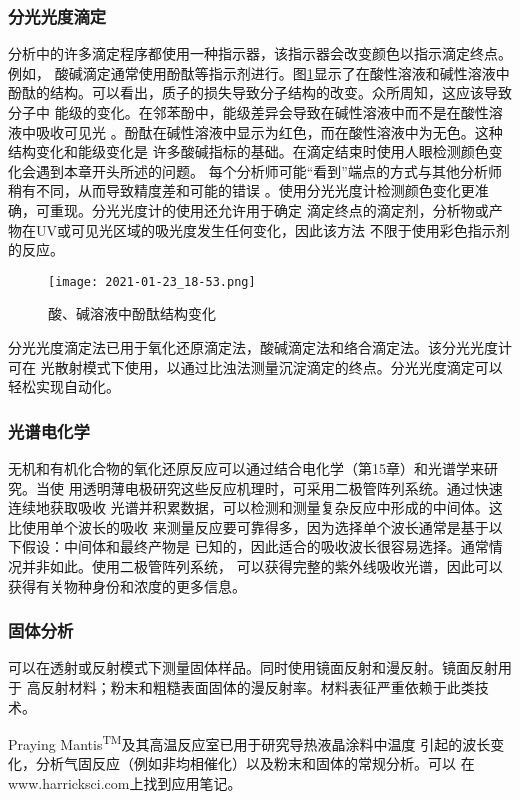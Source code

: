 \subsubsection{分光光度滴定}
分析中的许多滴定程序都使用一种指示器，该指示器会改变颜色以指示滴定终点。例如，
酸碱滴定通常使用酚酞等指示剂进行。图\ref{fig:5.44}显示了在酸性溶液和碱性溶液中
酚酞的结构。可以看出，质子的损失导致分子结构的改变。众所周知，这应该导致分子中
能级的变化。在邻苯酚中，能级差异会导致在碱性溶液中而不是在酸性溶液中吸收可见光
。酚酞在碱性溶液中显示为红色，而在酸性溶液中为无色。这种结构变化和能级变化是
许多酸碱指标的基础。在滴定结束时使用人眼检测颜色变化会遇到本章开头所述的问题。
每个分析师可能“看到”端点的方式与其他分析师稍有不同，从而导致精度差和可能的错误
。使用分光光度计检测颜色变化更准确，可重现。分光光度计的使用还允许用于确定
滴定终点的滴定剂，分析物或产物在UV或可见光区域的吸光度发生任何变化，因此该方法
不限于使用彩色指示剂的反应。
\begin{figure}[htpb]
    \centering
    \texttt{[image: 2021-01-23\_18-53.png]}
    \caption{酸、碱溶液中酚酞结构变化}
    \label{fig:5.44}
\end{figure}

分光光度滴定法已用于氧化还原滴定法，酸碱滴定法和络合滴定法。该分光光度计可在
光散射模式下使用，以通过比浊法测量沉淀滴定的终点。分光光度滴定可以轻松实现自动化。
\subsubsection{光谱电化学}
无机和有机化合物的氧化还原反应可以通过结合电化学（第15章）和光谱学来研究。当使
用透明薄电极研究这些反应机理时，可采用二极管阵列系统。通过快速连续地获取吸收
光谱并积累数据，可以检测和测量复杂反应中形成的中间体。这比使用单个波长的吸收
来测量反应要可靠得多，因为选择单个波长通常是基于以下假设：中间体和最终产物是
已知的，因此适合的吸收波长很容易选择。通常情况并非如此。使用二极管阵列系统，
可以获得完整的紫外线吸收光谱，因此可以获得有关物种身份和浓度的更多信息。
\subsubsection{固体分析}
可以在透射或反射模式下测量固体样品。同时使用镜面反射和漫反射。镜面反射用于
高反射材料；粉末和粗糙表面固体的漫反射率。材料表征严重依赖于此类技术。

Praying Mantis\textsuperscript{TM}及其高温反应室已用于研究导热液晶涂料中温度
引起的波长变化，分析气固反应（例如非均相催化）以及粉末和固体的常规分析。可以
在www.harricksci.com上找到应用笔记。

